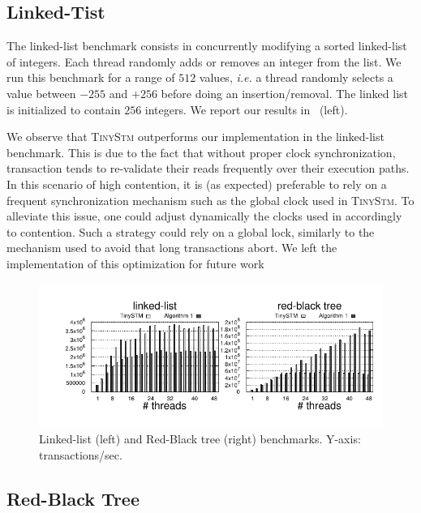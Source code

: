 \subsection{Linked-Tist}

The linked-list benchmark consists in concurrently modifying a sorted linked-list of integers. 
Each thread randomly adds or removes an integer from the list. 
We run this benchmark for a range of $512$ values, \emph{i.e.} a thread randomly selects a value between $-255$ and $+256$ before doing an insertion/removal.
The linked list is initialized to contain $256$ integers.
We report our results in ~(left).

We observe that \textsc{TinyStm} outperforms our implementation in the linked-list benchmark.
This is due to the fact that without proper clock synchronization, transaction tends to re-validate their reads frequently over their execution paths.
In this scenario of high contention, it is (as expected) preferable to rely on a frequent synchronization mechanism such as the global clock used in \textsc{TinyStm}.
To alleviate this issue, one could adjust dynamically the clocks used in  accordingly to contention. 
Such a strategy could rely on a global lock, similarly to the mechanism used to avoid that long transactions abort.
We left the implementation of this optimization for future work

\begin{figure}[!t]
  \centering
  \includegraphics[scale = 1.0]{results/intset/ll-rb.pdf}
  \caption{Linked-list (left) and Red-Black tree (right) benchmarks. Y-axis: transactions/sec. }
\end{figure}

\subsection{Red-Black Tree}

